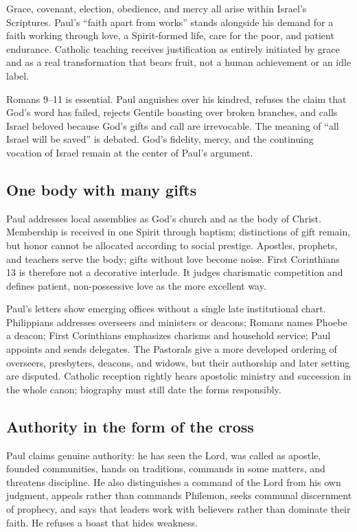 Grace, covenant, election, obedience, and mercy all arise within Israel's
Scriptures. Paul's ``faith apart from works'' stands alongside his demand for
a faith working through love, a Spirit-formed life, care for the poor, and
patient endurance. Catholic teaching receives justification as entirely
initiated by grace and as a real transformation that bears fruit, not a human
achievement or an idle label.

Romans 9--11 is essential. Paul anguishes over his kindred, refuses the claim
that God's word has failed, rejects Gentile boasting over broken branches, and
calls Israel beloved because God's gifts and call are irrevocable. The meaning
of ``all Israel will be saved'' is debated. God's fidelity, mercy, and the
continuing vocation of Israel remain at the center of Paul's argument.

\subsection{One body with many gifts}

Paul addresses local assemblies as God's church and as the body of Christ.
Membership is received in one Spirit through baptism; distinctions of gift
remain, but honor cannot be allocated according to social prestige. Apostles,
prophets, and teachers serve the body; gifts without love become noise. First
Corinthians 13 is therefore not a decorative interlude. It judges charismatic
competition and defines patient, non-possessive love as the more excellent way.

Paul's letters show emerging offices without a single late institutional
chart. Philippians addresses overseers and ministers or deacons; Romans names
Phoebe a deacon; First Corinthians emphasizes charisms and household service;
Paul appoints and sends delegates. The Pastorals give a more developed
ordering of overseers, presbyters, deacons, and widows, but their authorship
and later setting are disputed. Catholic reception rightly hears apostolic
ministry and succession in the whole canon; biography must still date the
forms responsibly.

\subsection{Authority in the form of the cross}

Paul claims genuine authority: he has seen the Lord, was called as apostle,
founded communities, hands on traditions, commands in some matters, and
threatens discipline. He also distinguishes a command of the Lord from his own
judgment, appeals rather than commands Philemon, seeks communal discernment of
prophecy, and says that leaders work with believers rather than dominate their
faith. He refuses a boast that hides weakness.

